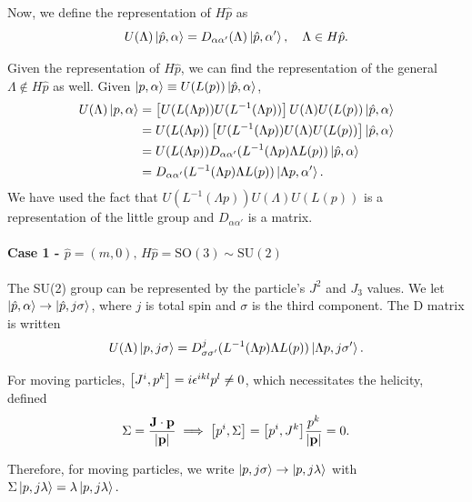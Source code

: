 \documentclass{article}
\begin{document}
Now, we define the representation of $H\hat p$ as 
$$U(\Lambda)\ket{\hat p,\alpha}=D_{\alpha\alpha'}(\Lambda)\ket{\hat p,\alpha'},\quad\Lambda\in H\hat p.$$

Given the representation of $H\hat p$, we can find the representation of the general $\Lambda\notin H\hat p$ as well. Given $\ket{p,\alpha}\equiv U(L(p))\ket{\hat p,\alpha}$,
\begin{align*}
    U(\Lambda)\ket{p,\alpha}&=\left[U(L(\Lambda p))U(L^{-1}(\Lambda p))\right]U(\Lambda)U(L(p))\ket{\hat p,\alpha}\\
    &=U(L(\Lambda p))\left[U(L^{-1}(\Lambda p))U(\Lambda)U(L(p))\right]\ket{\hat p,\alpha}\\
    &=U(L(\Lambda p))D_{\alpha\alpha'}(L^{-1}(\Lambda p)\Lambda L(p))\ket{\hat p,\alpha}\\
    &=D_{\alpha\alpha'}(L^{-1}(\Lambda p)\Lambda L(p))\ket{\Lambda p,\alpha'}.
\end{align*}
We have used the fact that $U(L^{-1}(\Lambda p))U(\Lambda)U(L(p))$ is a representation of the little group and $D_{\alpha\alpha'}$ is a matrix.

\paragraph{Case 1 - $\hat p=(m,0),\,H\hat p=\text{SO}(3)\sim\text{SU}(2)$}

The SU(2) group can be represented by the particle's $J^2$ and $J_3$ values. We let $\ket{\hat p,\alpha}\to\ket{\hat p,j\sigma}$, where $j$ is total spin and $\sigma$ is the third component. The D matrix is written 
$$U(\Lambda)\ket{p,j\sigma}=D^j_{\sigma\sigma'}(L^{-1}(\Lambda p)\Lambda L(p))\ket{\Lambda p,j\sigma'}.$$

For moving particles, $\comm{J^i}{p^k}=i\epsilon^{ikl}p^l\ne 0$, which necessitates the helicity, defined 
$$\Sigma=\frac{\mathbf J\cdot\mathbf p}{\abs{\mathbf p}}\implies\comm{p^i}{\Sigma}=\comm{p^i}{J^k}\frac{p^k}{\abs{\mathbf p}}=0.$$

Therefore, for moving particles, we write $\ket{p,j\sigma}\to\ket{p,j\lambda}$ with $\Sigma\ket{p,j\lambda}=\lambda\ket{p,j\lambda}.$
\end{document}
